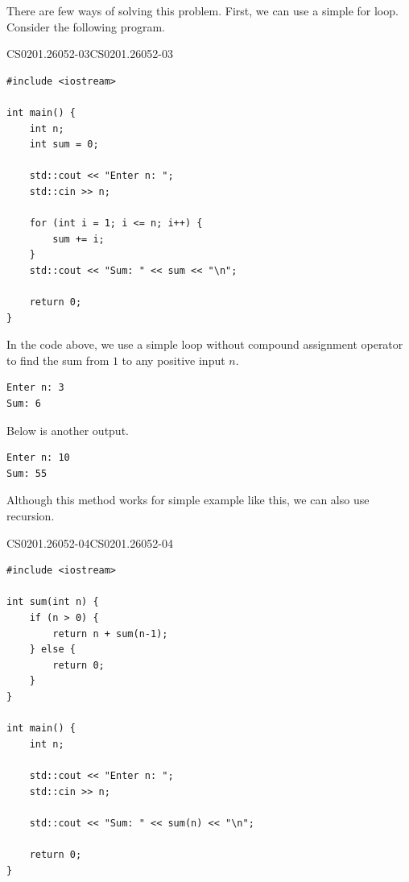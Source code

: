 \documentclass[../../../main.tex]{subfiles}
\begin{document}
\begin{solution}
There are few ways of solving this problem. First, we can use a
simple for loop. Consider the following program.

\begin{cppboxSolution}{CS0201.26052-03}{CS0201.26052-03}
\begin{lstlisting}[style=cppstyle]
#include <iostream>

int main() {
    int n;
    int sum = 0;

    std::cout << "Enter n: ";
    std::cin >> n;

    for (int i = 1; i <= n; i++) {
        sum += i;
    }
    std::cout << "Sum: " << sum << "\n";

    return 0;
}
\end{lstlisting}
\end{cppboxSolution}

In the code above, we use a simple loop without compound assignment
operator to find the sum from $1$ to any positive input $n$.

\begin{outputboxSolution}
\begin{lstlisting}[style=basic]
Enter n: 3
Sum: 6
\end{lstlisting}
\end{outputboxSolution}

Below is another output.

\begin{outputboxSolution}
\begin{lstlisting}[style=basic]
Enter n: 10
Sum: 55
\end{lstlisting}
\end{outputboxSolution}

Although this method works for simple example like this, we can also
use recursion.

\begin{cppboxSolution}{CS0201.26052-04}{CS0201.26052-04}
\begin{lstlisting}[style=cppstyle]
#include <iostream>

int sum(int n) {
    if (n > 0) {
        return n + sum(n-1);
    } else {
        return 0;
    }
}

int main() {
    int n;

    std::cout << "Enter n: ";
    std::cin >> n;
    
    std::cout << "Sum: " << sum(n) << "\n";

    return 0;
}
\end{lstlisting}
\end{cppboxSolution}


\end{solution}
\end{document}
